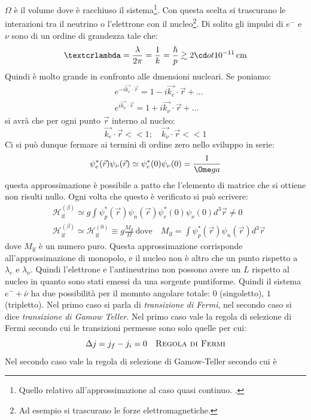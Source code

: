 $\Omega$ è il volume dove è racchiuso il sistema\footnote{Quello relativo 
all'approssimazione al caso quasi continuo. .}.
Con questa scelta si trascurano le interazioni tra il neutrino o l'elettrone 
con il nucleo\footnote{Ad esempio si trascurano le forze elettromagnetiche. }.
Di solito gli impulsi di $e^-$ e $\nu$ sono di un ordine di grandezza tale che:
\[
  
\text{\textcrlambda}=\frac{\lambda}{2\pi}=\frac{1}{k}=\frac{\hbar}{p}\gtrsim2\cd
ot10^{-11}\,\si{\centi\meter}
\]
Quindi \textcrlambda è molto grande in confronto alle dmensioni nucleari. Se 
poniamo:
\begin{align*}
&e^{-i\vec{k_e}\cdot\vec{r}}=1-i\vec{k_e}\cdot\vec{r}+\dots\\
&e^{i\vec{k_{\nu}}\cdot\vec{r}}=1+i\vec{k_{\nu}}\cdot\vec{r}+\dots
\end{align*}
si avrà che per ogni punto $\vec{r}$ interno al nucleo:
\[
\vec{k_e}\cdot\vec{r}<<1;\quad\vec{k_{\nu}}\cdot\vec{r}<<1
\]
Ci si può dunque fermare ai termini di ordine zero nello sviluppo in serie:
\[
\psi_e^*(\vec{r})\psi_{\nu}(\vec{r})\simeq\psi_e^*(0)\psi_{\nu}(0)=\frac{1}{\Ome
ga}
\]
questa approssimazione è possibile a patto che l'elemento di matrice che si 
ottiene non risulti nullo. Ogni volta che questo è verificato si può scrivere:
\begin{align*}
&\mathcal{H}_{\text{if}}^{(\beta)}\simeq 
g\int\psi_p^*(\vec{r})\psi_n(\vec{r})\psi_e^*(0)\psi_{\nu}(0)d^3\vec{r}\neq0\\
&\mathcal{H}_{\text{if}}^{(\beta)}\simeq\mathcal{H}_{\text{if}}^{(0)}\equiv 
g\frac{M_{\text{if}}}{\Omega}\,\text{dove}\quad 
M_{\text{if}}=\int\psi_p^*(\vec{r})\psi_n(\vec{r})d^3\vec{r}
\end{align*}
dove $M_{\text{if}}$ è un numero puro. Questa approssimazione corrisponde 
all'approssimazione di monopolo, e il nucleo non è altro che un punto rispetto 
a $\lambda_e$ e $\lambda_{\nu}$.
Quindi l'elettrone e l'antineutrino non possono avere un $L$ rispetto al nucleo
in quanto sono stati emessi da una sorgente puntiforme. Quindi il sistema 
$e^-+\bar{\nu}$ ha due possibilità
per il momnto angolare totale: $0$ (singoletto), $1$ (tripletto). Nel primo caso
si parla di \textit{transizione di Fermi}, nel secondo caso si dice 
\textit{transizione di Gamow Teller}.
Nel primo caso vale la regola di selezione di Fermi secondo cui le transizioni 
permesse sono solo quelle per cui:
\[
  \Delta j=j_f-j_i=0\quad\text{\textsc{Regola di Fermi}}
\]
Nel secondo caso vale la regola di selezione di Gamow-Teller secondo cui è
